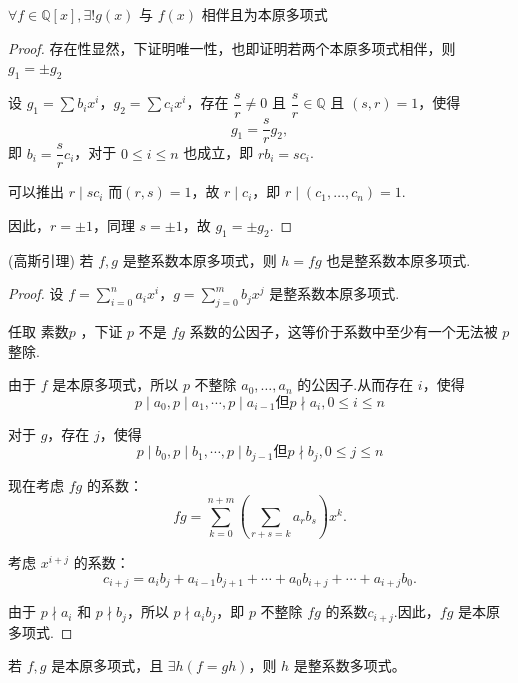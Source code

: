 \begin{lemma}\label{1.5.3}
	$\forall f \in \mathbb{Q}[x], \exists!g(x)$ 与 $f(x)$ 相伴且为本原多项式
\end{lemma}
\begin{proof}
	存在性显然，下证明唯一性，也即证明若两个本原多项式相伴，则 $g_1= \pm g_2$
	
	设 \( g_1 = \sum b_i x^i \)，\( g_2 = \sum c_i x^i \)，存在 \( \dfrac{s}{r} \neq 0 \) 且 \( \dfrac{s}{r} \in \mathbb{Q} \) 且 \( (s, r) = 1 \)，使得
	\[ g_1 = \frac{s}{r} g_2, \]
	即 \( b_i = \dfrac{s}{r} c_i \)，对于 \( 0 \leqslant i \leqslant n \) 也成立，即 \( r b_i = s c_i \).
	
	可以推出 \( r \mid s c_i \) 而\( (r, s) = 1 \)，故 \( r \mid c_i \)，即 \( r \mid (c_1, \ldots, c_n) = 1 \).
	
	因此，\( r = \pm 1 \)，同理 \( s = \pm 1 \)，故 \( g_1 = \pm g_2 \).
\end{proof}
\begin{theorem}(高斯引理)\label{高斯引理}
	若 \( f, g \) 是整系数本原多项式，则 \( h = fg \) 也是整系数本原多项式.
\end{theorem}
\begin{proof}
	设 \( f = \sum\limits_{i=0}^n a_i x^i \)，\( g = \sum\limits_{j=0}^m b_j x^j \) 是整系数本原多项式.
	
	任取 素数\( p \) ，下证 \( p \) 不是 \( fg \) 系数的公因子，这等价于系数中至少有一个无法被 \( p \) 整除.
	
	由于 \( f \) 是本原多项式，所以 \( p \) 不整除 \( a_0, \ldots, a_n \) 的公因子.从而存在 \( i \)，使得
	\[ p \mid a_0, p \mid a_1,\cdots, p \mid a_{i-1}\text{但} p \nmid a_i,0\leqslant i\leqslant n \]
	
	对于 \( g \)，存在 \( j \)，使得
	\[ p \mid b_0, p \mid b_1,\cdots, p \mid b_{j-1}\text{但} p \nmid b_j,0\leqslant j\leqslant n \]
	
	现在考虑 \( fg \) 的系数：
	\[ fg = \sum_{k=0}^{n+m} \left( \sum_{r+s=k} a_r b_s \right) x^k. \]
	
	考虑 \( x^{i+j} \) 的系数：
	\[ c_{i+j} = a_i b_j + a_{i-1} b_{j+1} + \cdots + a_0 b_{i+j} + \cdots + a_{i+j} b_0. \]
	
	由于 \( p \nmid a_i \) 和 \( p \nmid b_j \)，所以 \( p \nmid a_i b_j \)，即 \( p \) 不整除 \( fg \) 的系数$c_{i+j}$.因此，\( fg \) 是本原多项式.
	
\end{proof}
\begin{corollary}
	若 \( f, g \) 是本原多项式，且 \( \exists h(f = gh) \)，则 \( h \) 是整系数多项式。
\end{corollary}

